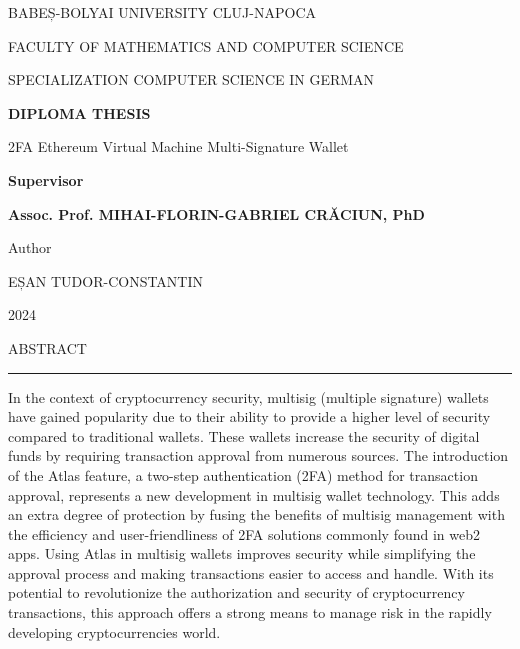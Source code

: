\documentclass[12pt]{report}
\begin{document}
	\newpage
	\begin{titlepage}
		\centering
		{\large BABEȘ-BOLYAI UNIVERSITY CLUJ-NAPOCA\par}
		\vspace{0.5cm}
		{\large FACULTY OF MATHEMATICS AND COMPUTER SCIENCE\par}
		\vspace{0.5cm}
		{\large SPECIALIZATION COMPUTER SCIENCE IN GERMAN\par}
		\vspace{2cm}
		{\LARGE\bfseries DIPLOMA THESIS\par}
		\vspace{2cm}
		{\Large 2FA Ethereum Virtual Machine Multi-Signature Wallet\par}
		\vfill
		\begin{flushleft}
			{\large \textbf{Supervisor}\par}
			\parbox{10cm}{\large \textbf{Assoc. Prof. MIHAI-FLORIN-GABRIEL CRĂCIUN, PhD}}
		\end{flushleft}
		\vspace{1.5cm}
		\begin{flushright}
			{\large Author\par}
			{\large EȘAN TUDOR-CONSTANTIN\par}
			\vspace{1cm}
			{\large 2024\par}
		\end{flushright}
	\end{titlepage}
	
	\newpage
	\thispagestyle{empty}
	\mbox{}
	\newpage
	
	\cleardoublepage
	ABSTRACT
	\vspace{0.5cm}    
	\hrule
	\vspace{0.5cm}    
	
	In the context of cryptocurrency security, multisig (multiple signature) wallets have gained popularity due to their ability to provide a higher level of security compared to traditional wallets. These wallets increase the security of digital funds by requiring transaction approval from numerous sources. The introduction of the Atlas feature, a two-step authentication (2FA) method for transaction approval, represents a new development in multisig wallet technology. This adds an extra degree of protection by fusing the benefits of multisig management with the efficiency and user-friendliness of 2FA solutions commonly found in web2 apps. Using Atlas in multisig wallets improves security while simplifying the approval process and making transactions easier to access and handle. With its potential to revolutionize the authorization and security of cryptocurrency transactions, this approach offers a strong means to manage risk in the rapidly developing cryptocurrencies world.
	
\end{document}
